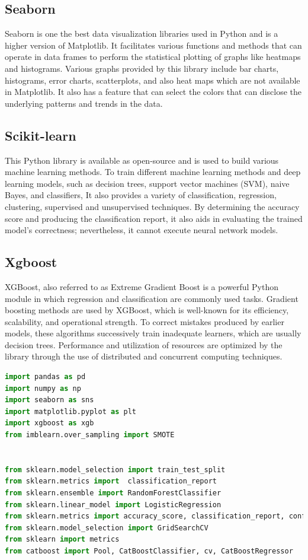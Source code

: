 \subsection{Seaborn}
Seaborn is one the best data visualization libraries used in Python and is a higher version of Matplotlib. It facilitates various functions and methods that can operate in data frames to perform the statistical plotting of graphs like heatmaps and histograms. Various graphs provided by this library include bar charts, histograms, error charts, scatterplots, and also heat maps which are not available in Matplotlib. It also has a feature that can select the colors that can disclose the underlying patterns and trends in the data.

\subsection{Scikit-learn}
This Python library is available as open-source and is used to build various machine learning methods. To train different machine learning methods and deep learning models, such as decision trees, support vector machines (SVM), naive Bayes, and classifiers, It also provides a variety of classification, regression, clustering, supervised and unsupervised techniques. By determining the accuracy score and producing the classification report, it also aids in evaluating the trained model's correctness; nevertheless, it cannot execute neural network models.

\subsection{Xgboost}
XGBoost, also referred to as Extreme Gradient Boost is a powerful Python module in which regression and classification are commonly used tasks. Gradient boosting methods are used by XGBoost, which is well-known for its efficiency, scalability, and operational strength. To correct mistakes produced by earlier models, these algorithms successively train inadequate learners, which are usually decision trees. Performance and utilization of resources are optimized by the library through the use of distributed and concurrent computing techniques.

\begin{lstlisting}[language=Python, caption={Importing libraries}, label=list:python_code_ex]
import pandas as pd
import numpy as np
import seaborn as sns
import matplotlib.pyplot as plt
import xgboost as xgb
from imblearn.over_sampling import SMOTE


from sklearn.model_selection import train_test_split
from sklearn.metrics import  classification_report
from sklearn.ensemble import RandomForestClassifier
from sklearn.linear_model import LogisticRegression
from sklearn.metrics import accuracy_score, classification_report, confusion_matrix, f1_score
from sklearn.model_selection import GridSearchCV
from sklearn import metrics
from catboost import Pool, CatBoostClassifier, cv, CatBoostRegressor
\end{lstlisting}

